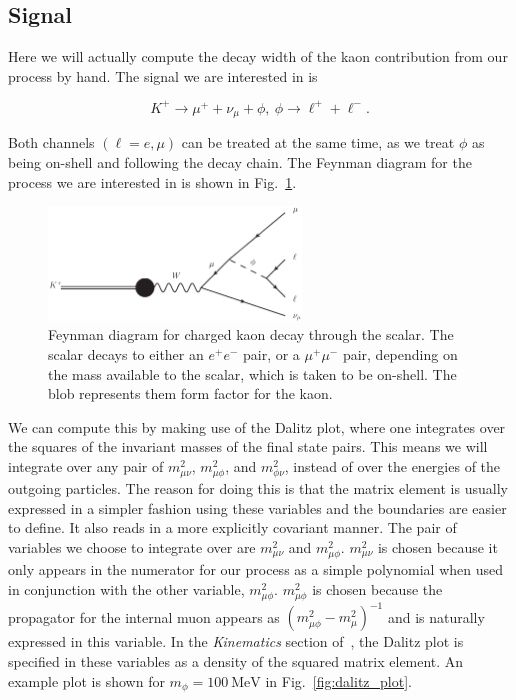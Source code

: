 \subsection{Signal}
Here we will actually compute the decay width of the kaon contribution from our process by hand.
The signal we are interested in is

\begin{equation}
    K^+ \rightarrow \mu^+ + \nu_\mu + \phi,~\phi \rightarrow \ell^+ + \ell^-\textrm{.}
\end{equation}

\noindent Both channels $(\ell = e, \mu)$ can be treated at the same time, as we treat $\phi$ as being on-shell and following the decay chain.
The Feynman diagram for the process we are interested in is shown in Fig.~\ref{fig:kaon_decay_signal}.

\begin{figure}[h]
    \centering
    \includegraphics[width=0.6\textwidth]{Figures/feynman_diagrams/k_munull_scalar}
    \caption[Feynman diagram for charged kaon decay through the scalar.]{Feynman diagram for charged kaon decay through the scalar. The scalar decays to either an $e^+ e^-$ pair, or a $\mu^+ \mu^-$ pair, depending on the mass available to the scalar, which is taken to be on-shell. The blob represents them form factor for the kaon.}
    \label{fig:kaon_decay_signal}
\end{figure}

We can compute this by making use of the Dalitz plot, where one integrates over the squares of the invariant masses of the final state pairs.
This means we will integrate over any pair of $m_{\mu\nu}^2$, $m_{\mu\phi}^2$, and $m_{\phi\nu}^2$, instead of over the energies of the outgoing particles.
The reason for doing this is that the matrix element is usually expressed in a simpler fashion using these variables and the boundaries are easier to define.
It also reads in a more explicitly covariant manner.
The pair of variables we choose to integrate over are $m_{\mu\nu}^2$ and $m_{\mu\phi}^2$.
$m_{\mu\nu}^2$ is chosen because it only appears in the numerator for our process as a simple polynomial when used in conjunction with the other variable, $m_{\mu\phi}^2$.
$m_{\mu\phi}^2$ is chosen because the propagator for the internal muon appears as $\left(m_{\mu\phi}^2 - m_\mu^2\right)^{-1}$ and is naturally expressed in this variable.
In the \emph{Kinematics} section of~\cite{Agashe:2014kda}, the Dalitz plot is specified in these variables as a density of the squared matrix element.
An example plot is shown for $m_\phi = 100~\textrm{MeV}$ in Fig.~\ref{fig:dalitz_plot}.


